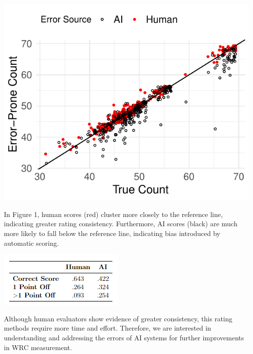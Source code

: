\documentclass[a0paper,landscape]{baposter}
\begin{document}
\begin{poster}
{\begin{center}
 \includegraphics[width=\linewidth]{scatter_v2.pdf}
\end{center}
\smallskip
  
In Figure 1, human scores (red) cluster more closely to the reference line, indicating greater rating consistency. Furthermore, AI scores (black) are much more likely to fall below the reference line, indicating bias introduced by automatic scoring.

\begin{center}
    \includegraphics[width=.7\linewidth]{sum_table2.png}\\ 
\end{center}

Although human evaluators show evidence of greater consistency, this rating methods require more time and effort. Therefore, we are interested in understanding and addressing the errors of AI systems for further improvements in WRC measurement. 
}


\end{poster}
\end{document}
